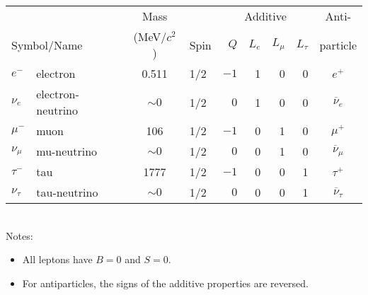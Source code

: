 \documentclass[11pt]{article}
\begin{document}
\begin{table}[tbph]
\begin{tabular}[b]{llclrrrrc}
&& Mass && \multicolumn{4}{|c|}{Additive}& Anti- \\
\multicolumn{2}{l}{Symbol/Name} & (MeV/$c^2$) & Spin\hspace{4mm} &
\multicolumn{1}{|r}{$Q$}
 & $L_e$ & $L_\mu$ & \multicolumn{1}{r|}{$L_\tau$} & particle \\
\hline\hline
$e^-$   & electron          & 0.511    & 1/2 & $-1$ & 1 & 0 & 0 & $e^+$      \\
$\nu_e$ & electron-neutrino & ${\sim}0$ & 1/2 & $ 0$ & 1 & 0 & 0 & $\overline\nu_e$\\
[0.5ex]
$\mu^-$  & muon             & 106      & 1/2 & $-1$ & 0 & 1 & 0  & $\mu^+$ \\
$\nu_\mu$ & mu-neutrino     & ${\sim}0$ & 1/2 & $ 0$ & 0 & 1 & 0 & $\overline\nu_\mu$\\
[0.5ex]
$\tau^-$ & tau              & 1777     & 1/2 & $-1$ & 0 & 0 & 1  & $\tau^+$ \\
$\nu_\tau$ & tau-neutrino   & ${\sim}0$ & 1/2 & $ 0$ & 0 & 0 & 1 & $\overline\nu_\tau$\\
\hline
\end{tabular}\\[0.5ex]
Notes:
\vspace{-4mm}
\begin{itemize}
\setlength{\itemsep}{-2mm}
\item All leptons have $B=0$ and $S=0$.
\item For antiparticles, the signs of the additive properties are reversed.
\end{itemize}
\end{table}
\end{document}
